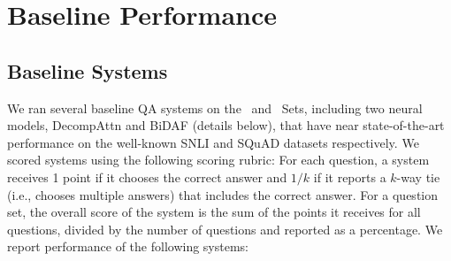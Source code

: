 \section{Baseline Performance}

\subsection{Baseline Systems}

We ran several baseline QA systems on the \Challenge~and \Additional~Sets, including two neural models, DecompAttn and BiDAF (details below), that have near state-of-the-art performance on
the well-known SNLI and SQuAD datasets respectively. We scored systems using the following scoring rubric: For each question, a system receives 1 point if it chooses the correct answer and $1/k$ if it reports a $k$-way tie (i.e., chooses multiple answers) that includes the correct answer. For a question set, the overall score of the system is the sum of the points it receives for all questions, divided by the number of questions and reported as a percentage. We report performance of the following systems:

